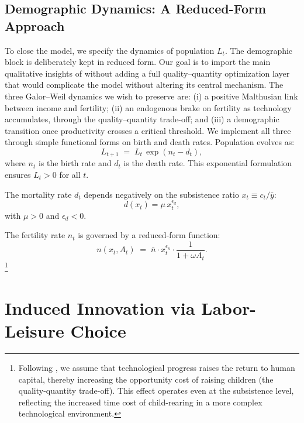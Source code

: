 \documentclass[11pt,a4paper]{article}
\begin{document}
\subsection*{Demographic Dynamics: A Reduced-Form Approach}
\label{sec:demography}

To close the model, we specify the dynamics of population \(L_t\). The demographic block is deliberately kept in reduced form. Our goal is to import the main qualitative insights of \textcite{GalorWeil2000} without adding a full quality--quantity optimization layer that would complicate the model without altering its central mechanism. The three Galor--Weil dynamics we wish to preserve are: (i) a positive Malthusian link between income and fertility; (ii) an endogenous brake on fertility as technology accumulates, through the quality--quantity trade-off; and (iii) a demographic transition once productivity crosses a critical threshold. We implement all three through simple functional forms on birth and death rates. Population evolves as:
\begin{equation}
  L_{t+1} \;=\; L_t\,\exp(n_t - d_t),
  \label{eq:L_law}
\end{equation}
where \(n_t\) is the birth rate and \(d_t\) is the death rate. This exponential formulation ensures \(L_t > 0\) for all \(t\).

The mortality rate \(d_t\) depends negatively on the subsistence ratio \(x_t \equiv c_t/\bar y\):
\begin{equation}
  d(x_t) = \mu \, x_t^{\epsilon_d},
\end{equation}
with \(\mu > 0\) and \(\epsilon_d < 0\).

The fertility rate \(n_t\) is governed by a reduced-form function:
\begin{equation}
  n(x_t, A_t) \;=\; \bar{n} \cdot x_t^{\epsilon_n} \cdot \frac{1}{1 + \omega A_t}.
  \label{eq:fertility_def}
\end{equation}\footnote{Following \textcite{GalorWeil2000}, we assume that technological progress raises the return to human capital, thereby increasing the opportunity cost of raising children (the quality-quantity trade-off). This effect operates even at the subsistence level, reflecting the increased time cost of child-rearing in a more complex technological environment.}

\section{Induced Innovation via Labor-Leisure Choice}
\label{sec:induced_innovation}
\end{document}
